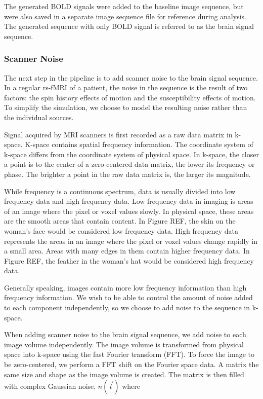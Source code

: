 The generated BOLD signals were added to the baseline image sequence, but were also saved in a separate image sequence file for reference during analysis. The generated sequence with only BOLD signal is referred to as the brain signal sequence.

\subsubsection{Scanner Noise}

The next step in the pipeline is to add scanner noise to the brain signal sequence. In a regular rs-fMRI of a patient, the noise in the sequence is the result of two factors: the spin history effects of motion and the susceptibility effects of motion. To simplify the simulation, we choose to model the resulting noise rather than the individual sources.

Signal acquired by MRI scanners is first recorded as a raw data matrix in k-space. K-space contains spatial frequency information. The coordinate system of k-space differs from the coordinate system of physical space. In k-space, the closer a point is to the center of a zero-centered data matrix, the lower its frequency or phase. The brighter a point in the raw data matrix is, the larger its magnitude. 

While frequency is a continuous spectrum, data is usually divided into low frequency data and high frequency data. Low frequency data in imaging is areas of an image where the pixel or voxel values slowly. In physical space, these areas are the smooth areas that contain content. In Figure REF, the skin on the woman's face would be considered low frequency data. High frequency data represents the areas in an image where the pixel or voxel values change rapidly in a small area. Areas with many edges in them contain higher frequency data. In Figure REF, the feather in the woman's hat would be considered high frequency data. %

Generally speaking, images contain more low frequency information than high frequency information. We wish to be able to control the amount of noise added to each component independently, so we choose to add noise to the sequence in k-space.

When adding scanner noise to the brain signal sequence, we add noise to each image volume independently. The image volume is transformed from physical space into k-space using the fast Fourier transform (FFT). To force the image to be zero-centered, we perform a FFT shift on the Fourier space data. A matrix the same size and shape as the image volume is created. The matrix is then filled with complex Gaussian noise, $n(\vec{l})$ where


